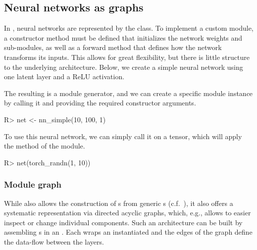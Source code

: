\documentclass[article]{jss}
\theoremstyle{definition}
\begin{document}
\subsection{Neural networks as graphs}

In , neural networks are represented by the  class.
To implement a custom module, a constructor method must be defined that initializes the network weights and sub-modules, as well as a forward method that defines how the network transforms its inputs.
This allows for great flexibility, but there is little structure to the underlying architecture.
Below, we create a simple neural network using one latent layer and a ReLU activation.


The resulting  is a module generator, and we can create a specific module instance by calling it and providing the required constructor arguments.

\begin{CodeInput}
R> net <- nn_simple(10, 100, 1)
\end{CodeInput}

To use this neural network, we can simply call it on a tensor, which will apply the  method of the module.

\begin{CodeInput}
R> net(torch_randn(1, 10))
\end{CodeInput}

\begin{CodeOutput}

\end{CodeOutput}

\subsubsection{Module graph}


While  also allows the construction of s from generic s (c.f.~), it also offers a systematic representation via directed acyclic graphs, which, e.g., allows to easier inspect or change individual components.
Such an architecture can be built by assembling s in an .
Each  wraps an instantiated  and the edges of the graph define the data-flow between the layers.
\end{document}
